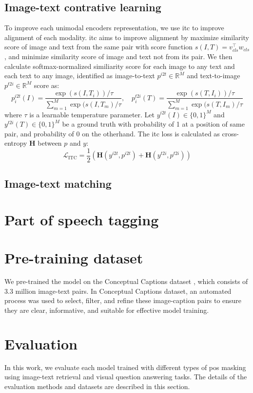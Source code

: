 \subsection{Image-text contrative learning}
To improve each unimodal encoders representation, we use \acrshort{itc} to improve alignment of each modality.
\acrshort{itc} aims to improve alignment by maximize similarity score of image and text from the same pair with score function \(s(I, T) = v_{cls}^\top w_{cls}\), and minimize similarity score of image and text not from its pair.
We then calculate softmax-normalized similiarity score for each image to any text and each text to any image, identified as image-to-text \(p^{i2t} \in \mathbb{R}^{M}\) and text-to-image \(p^{t2i} \in \mathbb{R}^{M}\) score as:
\[
    p^{i2t}_i(I) = \frac{ \exp{(s(I,T_i))/\tau} }{ \sum_{m=1}^{M}\exp{(s(I,T_m)/\tau} }, \quad p^{t2i}_i(T) = \frac{ \exp{(s(T,I_i))/\tau} }{ \sum_{m=1}^{M}\exp{(s(T,I_m)/\tau} }
\]
where \(\tau\) is a learnable temperature parameter. Let \( y^{i2t}(I) \in \{0,1\}^M \) and \( y^{t2i}(T) \in \{0,1\}^M \) be a ground truth with probability of 1 at a position of same pair, and probability of 0 on the otherhand.
The \acrshort{itc} loss is calculated as cross-entropy \(\mathbf{H}\) between \(p\) and \(y\):
\[
    \mathcal{L}_{\text{ITC}} = \frac{1}{2}(\mathbf{H}(y^{i2t},p^{i2t}) + \mathbf{H}(y^{t2i},p^{t2i}))
\]
\subsection{Image-text matching}
\section{Part of speech tagging}


\section{Pre-training dataset}
We pre-trained the model on the Conceptual Captions dataset \cite{conceptual-caption}, which consists of 3.3 million image-text pairs. 
In Conceptual Captions dataset, an automated process was used to select, filter, and refine these image-caption pairs to ensure they are clear, informative, and suitable for effective model training.

\section{Evaluation}
In this work, we evaluate each model trained with different types of \acrshort{pos} masking using image-text retrieval and visual question answering tasks. 
The details of the evaluation methods and datasets are described in this section.


